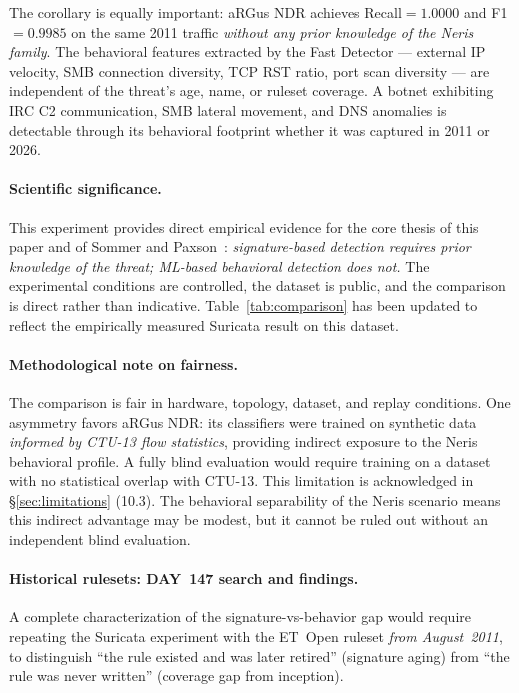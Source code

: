 \documentclass[11pt,a4paper]{article}
\begin{document}
    The corollary is equally important: aRGus NDR achieves Recall$=1.0000$ and
    F1$=0.9985$ on the same 2011 traffic \emph{without any prior knowledge of the Neris
    family}. The behavioral features extracted by the Fast Detector --- external IP velocity,
    SMB connection diversity, TCP RST ratio, port scan diversity --- are independent of the
    threat's age, name, or ruleset coverage. A botnet exhibiting IRC C2 communication, SMB
    lateral movement, and DNS anomalies is detectable through its behavioral footprint whether
    it was captured in 2011 or 2026.

    \paragraph{Scientific significance.}
    This experiment provides direct empirical evidence for the core thesis of this paper and of
    Sommer and Paxson~\cite{sommer2010}: \emph{signature-based detection requires prior
    knowledge of the threat; ML-based behavioral detection does not.} The experimental
    conditions are controlled, the dataset is public, and the comparison is direct rather than
    indicative. Table~\ref{tab:comparison} has been updated to reflect the empirically measured
    Suricata result on this dataset.

    \paragraph{Methodological note on fairness.}
    The comparison is fair in hardware, topology, dataset, and replay conditions. One asymmetry
    favors aRGus NDR: its classifiers were trained on synthetic data \emph{informed by CTU-13
    flow statistics}, providing indirect exposure to the Neris behavioral profile. A fully blind
    evaluation would require training on a dataset with no statistical overlap with CTU-13. This
    limitation is acknowledged in \S\ref{sec:limitations} (10.3). The behavioral separability of
    the Neris scenario means this indirect advantage may be modest, but it cannot be ruled out
    without an independent blind evaluation.

    \paragraph{Historical rulesets: DAY~147 search and findings.}
    A complete characterization of the signature-vs-behavior gap would require repeating the
    Suricata experiment with the ET~Open ruleset \emph{from August~2011}, to distinguish
    ``the rule existed and was later retired'' (signature aging) from ``the rule was never
    written'' (coverage gap from inception).
\end{document}
